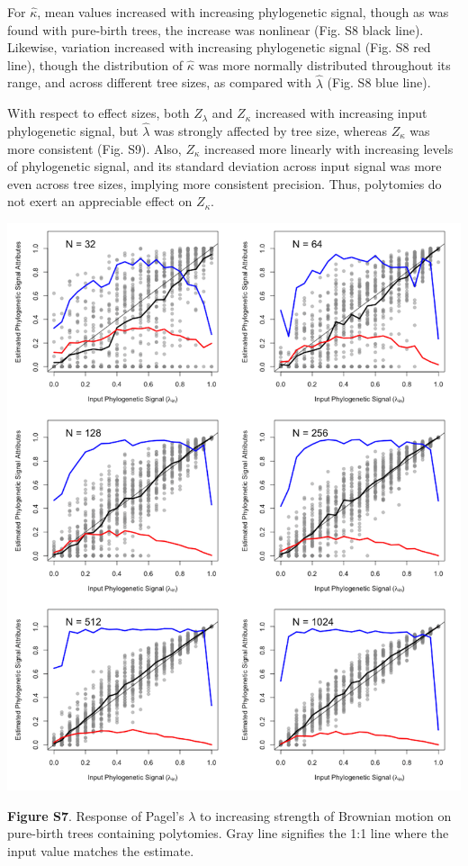 \documentclass[
]{article}
\begin{document}
For \(\hat\kappa\), mean values increased with increasing phylogenetic
signal, though as was found with pure-birth trees, the increase was
nonlinear (Fig. S8 black line). Likewise, variation increased with
increasing phylogenetic signal (Fig. S8 red line), though the
distribution of \(\hat\kappa\) was more normally distributed throughout
its range, and across different tree sizes, as compared with
\(\hat{\lambda}\) (Fig. S8 blue line). \hfill\break

With respect to effect sizes, both \(Z_{\lambda}\) and \(Z_{\kappa}\)
increased with increasing input phylogenetic signal, but
\(\hat{\lambda}\) was strongly affected by tree size, whereas
\(Z_{\kappa}\) was more consistent (Fig. S9). Also, \(Z_{\kappa}\)
increased more linearly with increasing levels of phylogenetic signal,
and its standard deviation across input signal was more even across tree
sizes, implying more consistent precision. Thus, polytomies do not exert
an appreciable effect on \(Z_{\kappa}\).

\includegraphics[width=0.95\linewidth]{fig.S7}

\textbf{Figure S7}. Response of Pagel's \(\lambda\) to increasing
strength of Brownian motion on pure-birth trees containing polytomies.
Gray line signifies the 1:1 line where the input value matches the
estimate.
\end{document}
